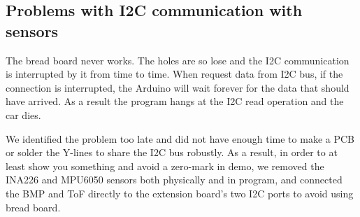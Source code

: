 \subsection{Problems with I2C communication with sensors}
The 
bread board never works. The holes are so 
lose and the I2C communication is interrupted by it from time to time. When request data from I2C bus, 
if the connection is interrupted, the Arduino will wait forever for the data that should have arrived. As a result the program hangs at the I2C read operation and the car dies. 

We identified the 
problem too late and did not have enough time to make a PCB or solder the Y-lines to share the I2C bus 
robustly. As a result, in order to at least show you something and avoid a zero-mark in demo, we removed the INA226 and MPU6050 sensors both physically and in program, and connected the BMP and ToF directly to the extension board's two I2C ports to avoid using bread board. %
